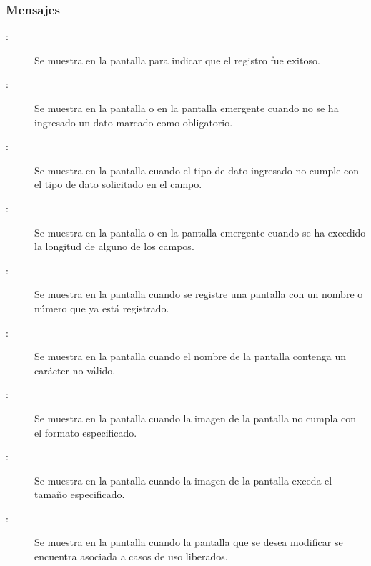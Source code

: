 \subsubsection{Mensajes}
	
\begin{description}
	\item[:] Se muestra en la pantalla  para indicar que el registro fue exitoso.
	\item[:] Se muestra en la pantalla  o en la pantalla emergente  cuando no se ha ingresado un dato marcado como obligatorio.
	\item[:] Se muestra en la pantalla  cuando el tipo de dato ingresado no cumple con el tipo de dato solicitado en el campo.
	\item[:] Se muestra en la pantalla  o en la pantalla emergente  cuando se ha excedido la longitud de alguno de los campos.
	\item[:] Se muestra en la pantalla  cuando se registre una pantalla con un nombre o número que ya está registrado.
	\item[:] Se muestra en la pantalla  cuando el nombre de la pantalla contenga un carácter no válido.
	\item[:] Se muestra en la pantalla  cuando la imagen de la pantalla no cumpla con el formato especificado.
	\item[:] Se muestra en la pantalla  cuando la imagen de la pantalla exceda el tamaño especificado.
	\item[:] Se muestra en la pantalla  cuando la pantalla que se desea modificar se encuentra asociada a casos de uso liberados.
	
\end{description}
